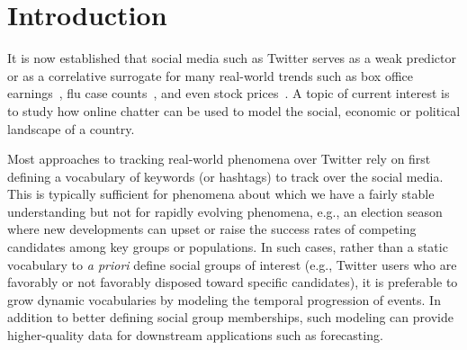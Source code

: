 \section{Introduction}
It is now established that social media such as Twitter serves as a weak
predictor or as a correlative surrogate for many real-world trends such
as %
box office earnings~\cite{asur2010predicting}, flu case counts~\cite{culotta2010towards}, and even stock 
prices~\cite{bollen2011twitter}. A topic of current interest is to study how
online chatter can be used to model
the social, economic or political landscape of a country.

Most approaches to tracking real-world phenomena over Twitter rely on first defining a vocabulary
of keywords (or hashtags) to track over the social media. This is typically sufficient for
phenomena about which we have a fairly stable understanding but not for rapidly evolving phenomena,
e.g., an election season where new developments can upset or raise the success rates of competing candidates
among key groups or populations.
In such cases, rather than %
a static vocabulary to {\it a priori} define social groups
of interest (e.g., Twitter users who are favorably or not favorably disposed
toward specific candidates), it is preferable to grow dynamic vocabularies by modeling the temporal progression of
events. In addition to better defining social group memberships, such modeling can provide
higher-quality data for downstream applications such as forecasting.

